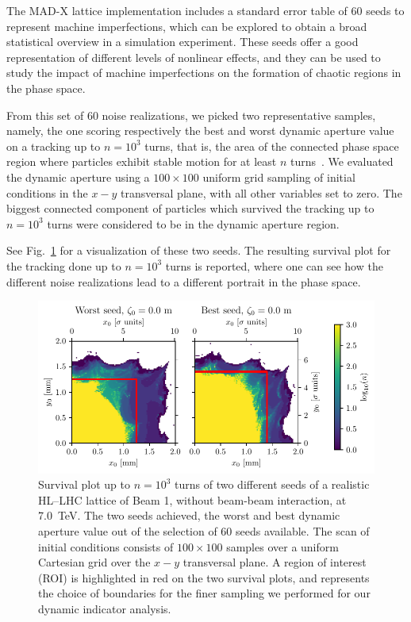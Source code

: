 The MAD-X lattice implementation includes a standard error table of 60 seeds to represent machine imperfections, which can be explored to obtain a broad statistical overview in a simulation experiment. These seeds offer a good representation of different levels of nonlinear effects, and they can be used to study the impact of machine imperfections on the formation of chaotic regions in the phase space.

From this set of 60 noise realizations, we picked two representative samples, namely, the one scoring respectively the best and worst dynamic aperture value on a tracking up to $n=10^3$ turns, that is, the area of the connected phase space region where particles exhibit stable motion for at least $n$ turns~\cite{DAdef, invlog}. We evaluated the dynamic aperture using a $100\times100$ uniform grid sampling of initial conditions in the $x-y$ transversal plane, with all other variables set to zero. The biggest connected component of particles which survived the tracking up to $n=10^3$ turns were considered to be in the dynamic aperture region.

See Fig.~\ref{fig:seed_presentation} for a visualization of these two seeds. The resulting survival plot for the tracking done up to $n=10^3$ turns is reported, where one can see how the different noise realizations lead to a different portrait in the phase space.

\begin{figure}[htp]
    \centering
    \includegraphics[width=\textwidth]{6_lhc_dynamic_indicators/figs/quick_scan.pdf}
    \caption{Survival plot up to $n=10^3$ turns of two different seeds of a realistic HL--LHC lattice of Beam 1, without beam-beam interaction, at \SI{7.0}{TeV}. The two seeds achieved, the worst and best dynamic aperture value out of the selection of 60 seeds available. The scan of initial conditions consists of $100\times100$ samples over a uniform Cartesian grid over the $x-y$ transversal plane. A region of interest (ROI) is highlighted in red on the two survival plots, and represents the choice of boundaries for the finer sampling we performed for our dynamic indicator analysis.}
    \label{fig:seed_presentation}
\end{figure}

